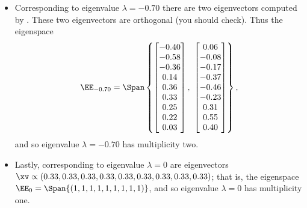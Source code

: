 \begin{example}
\begin{solution}
\begin{itemize}
\item Corresponding to eigenvalue \(\lambda=-0.70\) there are two eigenvectors computed by \script.
These two eigenvectors are orthogonal (you should check).
Thus the eigenspace
\begin{equation*}
\EE_{-0.70}=\Span\left\{ \begin{bmatrix} -0.40\\-0.58\\-0.36\\0.14\\0.36\\0.33\\0.25\\0.22\\0.03 \end{bmatrix},\  \begin{bmatrix} 0.06\\-0.08\\-0.17\\-0.37\\-0.46\\-0.23\\0.31\\0.55\\0.40 \end{bmatrix} \right\},
\end{equation*}
and so eigenvalue \(\lambda=-0.70\) has multiplicity two.

\item Lastly, corresponding to eigenvalue \(\lambda=0\) are eigenvectors \(\sloppy\xv\propto(0.33,0.33,0.33,0.33,0.33,0.33,0.33,0.33,0.33)\); 
that is, the eigenspace \(\EE_{0}=\Span\{(1,1,1,1,1,1,1,1,1)\}\),
and so eigenvalue \(\lambda=0\) has multiplicity one.


\end{itemize}
\end{solution}
\end{example}
